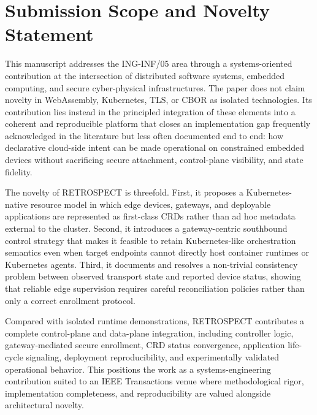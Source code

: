 \section{Submission Scope and Novelty Statement}

This manuscript addresses the ING-INF/05 area through a systems-oriented contribution at the intersection of distributed software systems, embedded computing, and secure cyber-physical infrastructures. The paper does not claim novelty in WebAssembly, Kubernetes, TLS, or CBOR as isolated technologies. Its contribution lies instead in the principled integration of these elements into a coherent and reproducible platform that closes an implementation gap frequently acknowledged in the literature but less often documented end to end: how declarative cloud-side intent can be made operational on constrained embedded devices without sacrificing secure attachment, control-plane visibility, and state fidelity.

The novelty of RETROSPECT is threefold. First, it proposes a Kubernetes-native resource model in which edge devices, gateways, and deployable applications are represented as first-class CRDs rather than ad hoc metadata external to the cluster. Second, it introduces a gateway-centric southbound control strategy that makes it feasible to retain Kubernetes-like orchestration semantics even when target endpoints cannot directly host container runtimes or Kubernetes agents. Third, it documents and resolves a non-trivial consistency problem between observed transport state and reported device status, showing that reliable edge supervision requires careful reconciliation policies rather than only a correct enrollment protocol.

Compared with isolated runtime demonstrations, RETROSPECT contributes a complete control-plane and data-plane integration, including controller logic, gateway-mediated secure enrollment, CRD status convergence, application life-cycle signaling, deployment reproducibility, and experimentally validated operational behavior. This positions the work as a systems-engineering contribution suited to an IEEE Transactions venue where methodological rigor, implementation completeness, and reproducibility are valued alongside architectural novelty.
